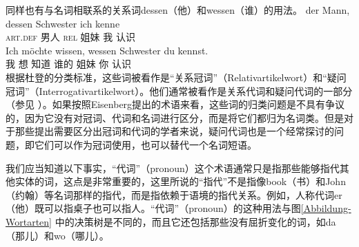 同样也有与名词相联系的关系词dessen（他）和wessen（谁）的用法。
\eal
\ex 
\gll der          Mann, dessen Schwester ich kenne\\
     \textsc{art}.\textsc{def} 男人  \textsc{rel} 姐妹 我 认识\\
\ex 
\gll Ich möchte wissen, wessen Schwester du kennst.\\
	 我 想 知道 谁的 姐妹 你 认识\\
\zl
根据杜登的分类标准，这些词被看作是“关系冠词”（Relativartikelwort）和“疑问冠词”（Interrogativartikelwort）。他们通常被看作是关系代词和疑问代词的一部分（参见 ）。如果按照Eisenberg提出的术语来看，这些词的归类问题是不具有争议的，因为它没有对冠词、代词和名词进行区分，而是将它们都归为名词类。但是对于那些提出需要区分出冠词和代词的学者来说，疑问代词也是一个经常探讨的问题，即它们可以作为冠词使用，也可以替代一个名词短语。

我们应当知道以下事实，“代词”（pronoun）这个术语通常只是指那些能够指代其他实体的词，这点是非常重要的，这里所说的“指代”不是指像book（书）和John（约翰）等名词那样的指代，而是指依赖于语境的指代关系。例如，人称代词er（他）既可以指桌子也可以指人。“代词”（pronoun）的这种用法与图\ref{Abbildung-Wortarten}
中的决策树是不同的，而且它还包括那些没有屈折变化的词，如da（那儿）和wo（哪儿）。

